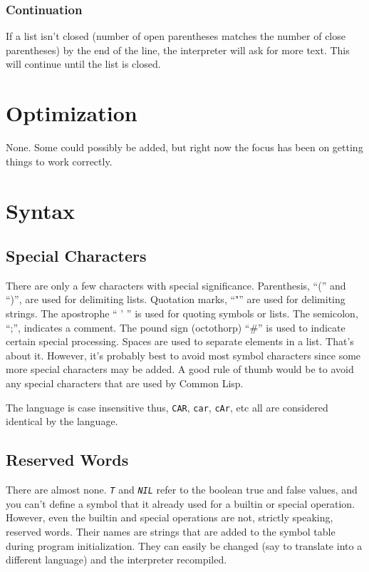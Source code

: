 \documentclass[10pt, openany]{book}
\newcommand{\function}[1]{\texttt{#1}}
\newcommand{\constant}[1]{\emph{\texttt{#1}}}
\newcommand{\cl}{Common Lisp}
\begin{document}
\subsubsection{Continuation}
If a list isn't closed (number of open parentheses matches the number of close parentheses) by the end of the line, the interpreter will ask for more text.  This will continue until the list is closed.

\section{Optimization}
None.  Some could possibly be added, but right now the focus has been on getting things to work correctly.

\section{Syntax}

\subsection{Special Characters}
There are only a few characters with special significance.  Parenthesis, ``('' and ``)'', are used for delimiting lists.  Quotation marks, ``"'' are used for delimiting strings.  The apostrophe `` ' '' is used for quoting symbols or lists.  The semicolon, ``;'', indicates a comment.  The pound sign (octothorp) ``\#'' is used to indicate certain special processing.  Spaces are used to separate elements in a list.  That's about it.  However, it's probably best to avoid most symbol characters since some more special characters may be added.  A good rule of thumb would be to avoid any special characters that are used by \cl.

The language is case insensitive thus, \function{CAR}, \function{car}, \function{cAr}, etc all are considered identical by the language.

\subsection{Reserved Words}
There are almost none.  \constant{T} and \constant{NIL} refer to the boolean true and false values, and you can't define a symbol that it already used for a builtin or special operation.  However, even the builtin and special operations are not, strictly speaking, reserved words.  Their names are strings that are added to the symbol table during program initialization.  They can easily be changed (say to translate into a different language) and the interpreter recompiled.
\end{document}
